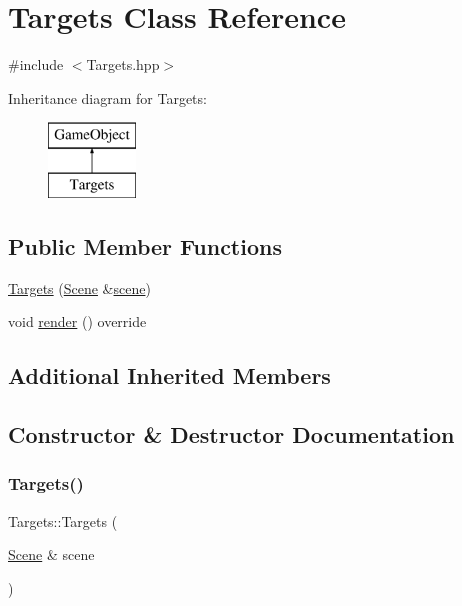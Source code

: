 \hypertarget{class_targets}{}\section{Targets Class Reference}
\label{class_targets}


{\ttfamily \#include $<$Targets.\+hpp$>$}

Inheritance diagram for Targets\+:\begin{figure}[H]
\begin{center}
\leavevmode
\includegraphics[height=2.000000cm]{class_targets}
\end{center}
\end{figure}
\subsection*{Public Member Functions}
\begin{DoxyCompactItemize}
\item 
\mbox{\hyperlink{class_targets_a4ab549593a5291fcd1e56adc97656acd}{Targets}} (\mbox{\hyperlink{class_scene}{Scene}} \&\mbox{\hyperlink{class_game_object_aeea61de934e13603696b4ed00e9fe42e}{scene}})
\item 
void \mbox{\hyperlink{class_targets_ae4f6dccb119a885728dc9e9c3e287c95}{render}} () override
\end{DoxyCompactItemize}
\subsection*{Additional Inherited Members}


\subsection{Constructor \& Destructor Documentation}
\mbox{\label{class_targets_a4ab549593a5291fcd1e56adc97656acd}} 
\subsubsection{\texorpdfstring{Targets()}{Targets()}}
{\footnotesize\ttfamily Targets\+::\+Targets (\begin{DoxyParamCaption}\item[{\mbox{\hyperlink{class_scene}{Scene}} \&}]{scene }\end{DoxyParamCaption})}



